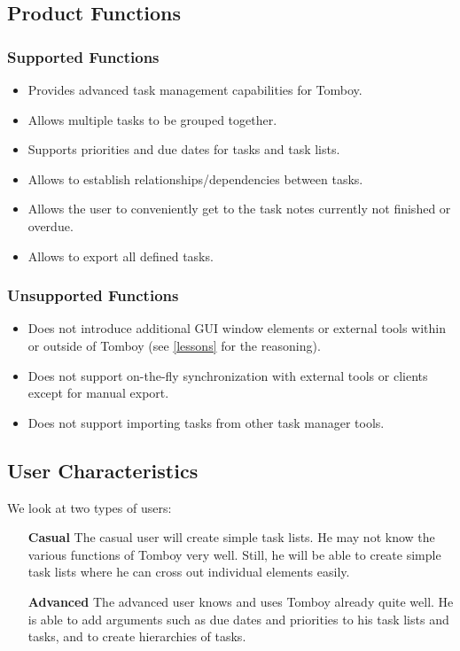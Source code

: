 \subsection{Product Functions}
\label{description:functions}

  \subsubsection*{Supported Functions}
  \label{description:functions:supported}

    \begin{itemize}
      \item Provides advanced task management capabilities for Tomboy.
      \item Allows multiple tasks to be grouped together.
      \item Supports priorities and due dates for tasks and task lists.
      \item Allows to establish relationships/dependencies between tasks.
      \item Allows the user to conveniently get to the task notes currently not finished or overdue.
      \item Allows to export all defined tasks.
    \end{itemize}

    \subsubsection*{Unsupported Functions}
      \label{description:functions:unsupported}
      \begin{itemize}
        \item Does not introduce additional GUI window elements or external tools within or outside of Tomboy (see \ref{lessons} for the reasoning).
        \item Does not support on-the-fly synchronization with external tools or clients except for manual export.
        \item Does not support importing tasks from other task manager tools.
      \end{itemize}

\subsection{User Characteristics}
\label{description:usercharacteristics}
We look at two types of users:

  \begin{itemize}
    \item[\bf{Casual}] The casual user will create simple task lists. He may not know the various functions of Tomboy very well. Still, he will be able to create simple task lists where he can cross out individual elements easily. 

    \item[\bf{Advanced}] The advanced user knows and uses Tomboy already quite well. He is able to add arguments such as due dates and priorities to his task lists and tasks, and to create hierarchies of tasks. 

  \end{itemize}


